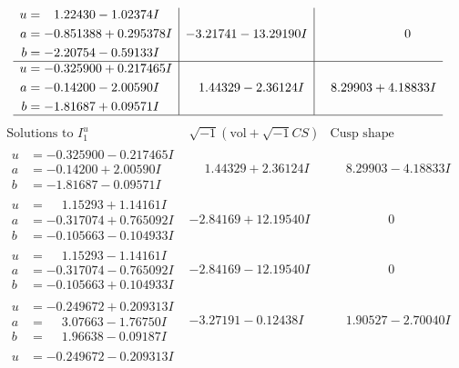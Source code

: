 \documentclass[1p]{elsarticle_modified}
\theoremstyle{definition}
\newcommand{\I}{\sqrt{-1}}
\begin{document}
$$\begin{array}{c|c|c}
\begin{aligned}
u &= \phantom{-}1.22430 - 1.02374 I \\
a &= -0.851388 + 0.295378 I \\
b &= -2.20754 - 0.59133 I\end{aligned}
 & -3.21741 - 13.29190 I & \phantom{-0.000000 } 0 \\ \hline\begin{aligned}
u &= -0.325900 + 0.217465 I \\
a &= -0.14200 - 2.00590 I \\
b &= -1.81687 + 0.09571 I\end{aligned}
 & \phantom{-}1.44329 - 2.36124 I & \phantom{-}8.29903 + 4.18833 I\\
 \hline 
 \end{array}$$\newpage$$\begin{array}{c|c|c}  
\text{Solutions to }I^u_{1}& \I (\text{vol} + \sqrt{-1}CS) & \text{Cusp shape}\\
 \hline 
\begin{aligned}
u &= -0.325900 - 0.217465 I \\
a &= -0.14200 + 2.00590 I \\
b &= -1.81687 - 0.09571 I\end{aligned}
 & \phantom{-}1.44329 + 2.36124 I & \phantom{-}8.29903 - 4.18833 I \\ \hline\begin{aligned}
u &= \phantom{-}1.15293 + 1.14161 I \\
a &= -0.317074 + 0.765092 I \\
b &= -0.105663 - 0.104933 I\end{aligned}
 & -2.84169 + 12.19540 I & \phantom{-0.000000 } 0 \\ \hline\begin{aligned}
u &= \phantom{-}1.15293 - 1.14161 I \\
a &= -0.317074 - 0.765092 I \\
b &= -0.105663 + 0.104933 I\end{aligned}
 & -2.84169 - 12.19540 I & \phantom{-0.000000 } 0 \\ \hline\begin{aligned}
u &= -0.249672 + 0.209313 I \\
a &= \phantom{-}3.07663 - 1.76750 I \\
b &= \phantom{-}1.96638 - 0.09187 I\end{aligned}
 & -3.27191 - 0.12438 I & \phantom{-}1.90527 - 2.70040 I \\ \hline\begin{aligned}
u &= -0.249672 - 0.209313 I \\

\end{aligned}
\end{array}$$
\end{document}
